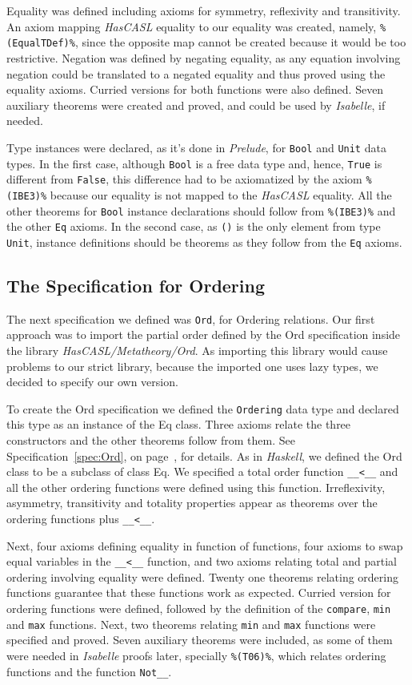 \documentclass[12pt,twoside]{article}
\numberwithin{spec}{subsection}
\numberwithin{proof}{subsection}
\numberwithin{figure}{subsection}
\numberwithin{code}{subsection}
\newcommand{\citeSpec}[1]{Specification~\ref{#1}, on page~\pageref{#1}}
\newcommand{\axiom}[1]{{\tt \%(#1)\%}}
\begin{document}
Equality was defined including axioms for symmetry, reflexivity and transitivity. An axiom mapping \textit{HasCASL} equality to our equality was created, namely, \axiom{EqualTDef}, since the opposite map cannot be created because it would be too restrictive. Negation was defined by negating equality, as any equation involving negation could be translated to a negated equality and thus proved using the equality axioms. Curried versions for both functions were also defined. Seven auxiliary theorems were created and proved, and could be used by \textit{Isabelle}, if needed.

Type instances were declared, as it's done in \textit{Prelude}, for \verb.Bool. and \verb.Unit. data types. In the first case, although \verb.Bool. is a free data type and, hence,  \verb.True. is different from \verb.False., this difference had to be axiomatized by the axiom \axiom{IBE3} because our equality is not mapped to the \textit{HasCASL} equality. All the other theorems for \verb.Bool. instance declarations should follow from \axiom{IBE3} and the other \verb.Eq. axioms. In the second case, as \verb.(). is the only element from type \verb.Unit., instance definitions should be theorems as they follow from the \verb.Eq. axioms.

\subsection{The Specification for Ordering}
The next specification we defined was \verb.Ord., for Ordering relations. Our first approach was to import the partial order defined by the Ord specification inside the library \textit{HasCASL/Metatheory/Ord}. As importing this library would cause problems to our strict library, because the imported one uses lazy types, we decided to specify our own version.

To create the Ord specification we defined the \verb.Ordering. data type and declared this type as an instance of the Eq class. Three axioms relate the three constructors and the other theorems follow from them. See \citeSpec{spec:Ord}, for details. As in \textit{Haskell}, we defined the Ord class to be a subclass of class Eq. We specified a total order function \verb.__<__. and all the other ordering functions were defined using this function. Irreflexivity, asymmetry, transitivity and totality properties appear as theorems over the ordering functions plus \verb.__<__..

Next, four axioms defining equality in function of functions, four axioms to swap equal variables in the \verb.__<__. function, and two axioms relating total and partial ordering involving equality were defined. Twenty one theorems relating ordering functions guarantee that these functions work as expected. Curried version for ordering functions were defined, followed by the definition of the \verb.compare., \verb.min. and \verb.max. functions. Next, two theorems relating \verb.min. and \verb.max. functions were specified and proved. Seven auxiliary theorems were included, as some of them were needed in \textit{Isabelle} proofs later, specially \axiom{T06}, which relates ordering functions and the function \verb.Not__..
\end{document}
